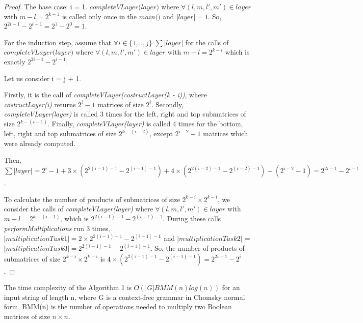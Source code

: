 \documentclass[runningheads]{llncs}
\begin{document}
\begin{proof}
The base case: i = 1. $\textit{completeVLayer(layer)}$ where $\forall (l, m, l', m') \in layer$ with $m - l = 2^{k - 1}$ is called only once in the  $\textit{main()}$ and $|layer| = 1$. So, $2^{2i - 1} - 2^{i - 1} = 2^1 - 2^0 = 1$.

For the induction step, assume that $\forall i \in \{ 1, .., j\}$ $\sum{|layer|}$ for the calls of $\textit{completeVLayer(layer)}$ where $\forall (l, m, l', m') \in layer$ with $m - l = 2^{k - i}$  which is exactly $2^{2i - 1} - 2^{i - 1}$.

Let us consider i = j + 1. 

Firstly, it is the call of \textit{completeVLayer(costructLayer(k - i))}, where \textit{costructLayer(i)} returns $2^i - 1$ matrices of size $2^i$. Secondly, \textit{completeVLayer(layer)} is called 3 times for the left, right and top submatrices of size $2^{k - (i - 1)}$. Finally, \textit{completeVLayer(layer)} is called 4 times for the bottom, left, right and top submatrices of size $2^{k - (i - 2)}$, except $2^{i - 2} - 1$ matrices which were already computed.

Then, $\sum{|layer|} = 2^{i} - 1 + 3 \times (2^{2(i - 1) - 1} - 2^{(i - 1) - 1}) + 4 \times (2^{2(i - 2) - 1} - 2^{(i - 2) - 1}) - (2^{i - 2} - 1) = 2^{2i - 1} - 2^{i - 1}$. 

To calculate the number of products of submatrices of size $2^{k - i} \times 2^{k - i}$, we consider the calls of \linebreak \textit{completeVLayer(layer)} where $\forall (l, m, l', m') \in layer$ with $m - l = 2^{k - (i - 1)}$, which is $2^{2(i - 1) - 1} - 2^{(i - 1) - 1}$. During these calls \textit{performMultiplications} run 3 times, $|multiplicationTask1| = 2 \times 2^{2(i - 1) - 1} - 2^{(i - 1) - 1}$ and \linebreak $|multiplicationTask2|$ = $|multiplicationTask3| = 2^{2(i - 1) - 1} - 2^{(i - 1) - 1}$. So, the number of products of submatrices of size $2^{k - i} \times 2^{k - i}$ is $4 \times (2^{2(i - 1) - 1} - 2^{(i - 1) - 1}) = 2^{2i - 1} - 2^{i}$.
\end{proof}

\begin{theorem}
The time complexity of the Algorithm 1 is $O(|G|BMM(n)log(n))$ for an input string of length n, where G is a context-free grammar in Chomsky normal form, BMM(n) is the number of operations needed to multiply two Boolean matrices of size $n \times n$.
\end{theorem}
\end{document}
